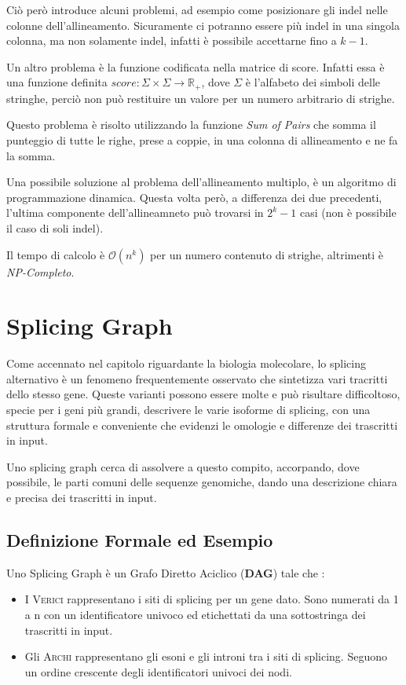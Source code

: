 Ciò però introduce alcuni problemi, ad esempio come posizionare gli indel nelle colonne dell'allineamento. Sicuramente ci potranno essere più indel in una singola colonna, ma non solamente indel, infatti è possibile accettarne fino a $k-1$.

Un altro problema è la funzione codificata nella matrice di score. Infatti essa è una funzione definita $score: \Sigma \times \Sigma \to \mathbb{R_+}$, dove $\Sigma$ è l'alfabeto dei simboli delle stringhe, perciò non può restituire un valore per un numero arbitrario di strighe.

Questo problema è risolto utilizzando la funzione \textit{Sum of Pairs} che somma il punteggio di tutte le righe, prese a coppie, in una colonna di allineamento e ne fa la somma.

Una possibile soluzione al problema dell'allineamento multiplo, è un algoritmo di programmazione dinamica. Questa volta però, a differenza dei due precedenti, l'ultima componente dell'allineamneto può trovarsi in $2^k-1$ casi (non è possibile il caso di soli indel).

Il tempo di calcolo è $\mathcal{O}(n^k)$ per un numero contenuto di strighe, altrimenti è \textit{NP-Completo}.

\section{Splicing Graph}
Come accennato nel capitolo riguardante la biologia molecolare, lo splicing alternativo è un fenomeno frequentemente osservato che sintetizza vari tracritti dello stesso gene.
Queste varianti possono essere molte e può risultare difficoltoso, specie per i geni più grandi, descrivere le varie isoforme di splicing, con una struttura formale e conveniente che evidenzi le omologie e differenze dei trascritti in input. 

Uno splicing graph cerca di assolvere a questo compito, accorpando, dove possibile, le parti comuni delle sequenze genomiche, dando una descrizione chiara e precisa dei trascritti in input.

\subsection{Definizione Formale ed Esempio}
Uno Splicing Graph è un Grafo Diretto Aciclico (\textbf{DAG}) tale che \cite{bubbles} \cite{spicingest}:

\begin{itemize}
    \item I \textsc{Verici} rappresentano i siti di splicing per un gene dato. Sono numerati da 1 a n con un identificatore univoco ed etichettati da una sottostringa dei trascritti in input.
    \item Gli \textsc{Archi} rappresentano gli esoni e gli introni tra i siti di splicing. Seguono un ordine crescente degli identificatori univoci dei nodi.
\end{itemize}

